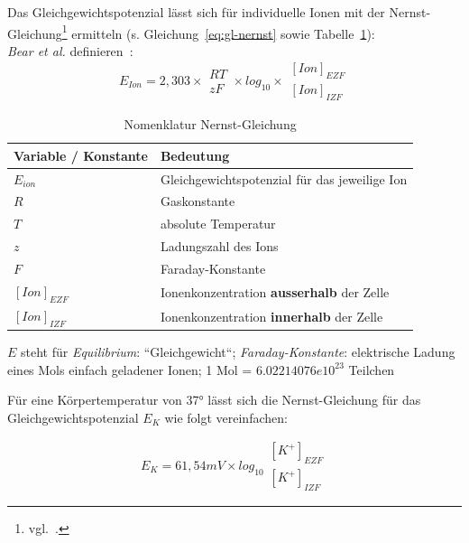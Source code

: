 {Das Gleichgewichtspotenzial lässt sich für individuelle Ionen mit der Nernst-Gleichung\footnote{
 vgl.~\cite[67]{FE19}.
} ermitteln (s. Gleichung~\ref{eq:gl-nernst} sowie Tabelle~\ref{tab:nernstkonstanten}):\\

\textit{Bear et al.} definieren~\cite[74, Exkurs 3.2]{BCP18}:
\begin{equation}
E_{Ion} = 2,303  \times \begin{matrix} RT \\ \hline zF \end{matrix} \times log_{10} \times \begin{matrix} [Ion]_{EZF} \\ \hline [Ion]_{IZF} \end{matrix}
\label{eq:gl-nernst}
\end{equation}



  {\renewcommand{\arraystretch}{1.5}%
\begin{table} %
 \centering
 \begin{tabular}{l |l }
  \textbf{Variable / Konstante} & \textbf{Bedeutung}  \\
  \hline
  $E_{ion}$            & Gleichgewichtspotenzial für das jeweilige Ion \\
  $R$                  & Gaskonstante \\
  $T$                  & absolute Temperatur \\
  $z$                  & Ladungszahl des Ions \\
  $F$                  & Faraday-Konstante \\
  $[Ion]_{EZF}$        & Ionenkonzentration \textbf{ausserhalb} der Zelle \\
  $[Ion]_{IZF}$        & Ionenkonzentration \textbf{innerhalb} der Zelle \\
 \end{tabular}
 \caption{Nomenklatur Nernst-Gleichung}
 \label{tab:nernstkonstanten}
 \small
  $E$ steht für \textit{Equilibrium}: ``Gleichgewicht``; \textit{Faraday-Konstante}: elektrische Ladung eines Mols einfach geladener Ionen; 1 Mol = $6.02214076e10^{23}$ Teilchen

\end{table}

\noindent
Für eine Körpertemperatur von 37° lässt sich die Nernst-Gleichung für das Gleichgewichtspotenzial $E_K$ wie folgt vereinfachen:

\begin{equation}
 E_{K} = 61,54 mV  \times log_{10} \begin{matrix} [K^+]_{EZF} \\ \hline [K^+]_{IZF} \end{matrix}
 \label{eq:gl-nernst-reduced-start}
\end{equation}

}}
